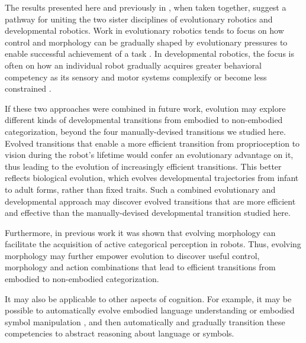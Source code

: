 \documentclass{sig-alternate}
\begin{document}
The results presented here and previously in \cite{bongard2010utility},
when taken together, suggest
a pathway for uniting the two sister disciplines of evolutionary robotics
and developmental robotics.
Work in evolutionary robotics tends to focus on how control and morphology
can be gradually shaped by evolutionary pressures to enable successful achievement
of a task \cite{bongard2013evolutionary}.
In developmental robotics, the focus is often on how an individual
robot gradually acquires greater behavioral competency as its sensory and
motor systems complexify or become less constrained \cite{lungarella2003developmental}.


If these two approaches were combined in future work, evolution may 
explore different kinds of developmental transitions from embodied to non-embodied
categorization, beyond the four manually-devised transitions we studied
here.
Evolved transitions that enable a more efficient transition from proprioception
to vision during the robot's lifetime would confer an evolutionary advantage on it, thus leading
to the evolution of increasingly efficient transitions.
This better reflects biological evolution, which evolves developmental trajectories
from infant to adult forms, rather than fixed traits.
Such a combined evolutionary and developmental approach
may discover evolved transitions that are
more efficient and effective than the manually-devised developmental transition
studied here.

Furthermore, in previous work \cite{bongard2010utility} it was shown that evolving morphology can
facilitate the acquisition of active categorical perception in robots.
Thus, evolving morphology may further empower evolution to discover
useful control, morphology and action combinations that lead to efficient
transitions from embodied to non-embodied categorization.

It may also be applicable to other aspects of cognition. For example,
it may be possible to automatically evolve embodied language understanding
\cite{fischer2008embodied} or
embodied symbol manipulation \cite{lakoff2000mathematics}, and then
automatically and gradually
transition these competencies to abstract reasoning about language or
symbols.


 

\balancecolumns
\end{document}
